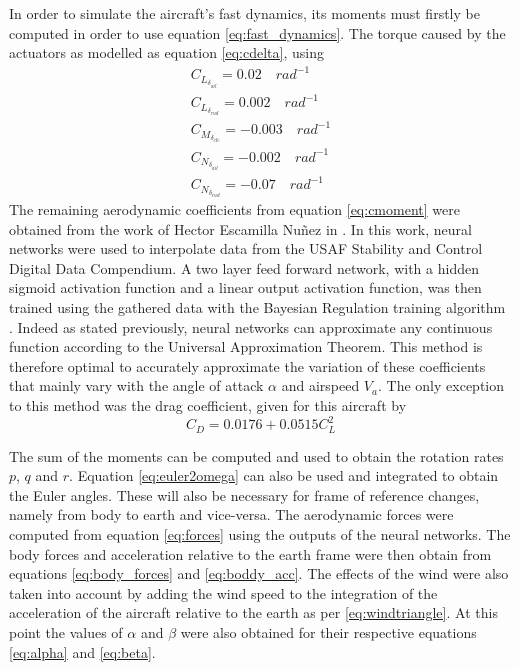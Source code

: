 In order to simulate the aircraft's fast dynamics, its moments must firstly be computed in order to use equation \ref{eq:fast_dynamics}. The torque caused by the actuators as modelled as equation \ref{eq:cdelta}, using
\begin{gather*}
C_{L_{\delta_{ail}}}=0.02 \quad rad^{-1}\\
C_{L_{\delta_{rud}}}=0.002 \quad rad^{-1}\\
C_{M_{\delta_{ele}}}=-0.003 \quad rad^{-1}\\
C_{N_{\delta_{ail}}}= -0.002 \quad rad^{-1}\\
C_{N_{\delta_{rud}}}= -0.07 \quad rad^{-1}
\end{gather*}
The remaining aerodynamic coefficients from equation \ref{eq:cmoment} were obtained from the work of Hector Escamilla Nuñez in \cite{hector}. In this work, neural networks were used to interpolate data from the USAF Stability and Control Digital Data Compendium. A two layer feed forward network, with a hidden sigmoid activation function and a linear output activation function, was then trained using the gathered data with the Bayesian Regulation training algorithm \cite{hector}. Indeed as stated previously, neural networks can approximate any continuous function according to the Universal Approximation Theorem. This method is therefore optimal to accurately approximate the variation of these coefficients that mainly vary with the angle of attack $\alpha$ and airspeed $V_a$. The only exception to this method was the drag coefficient, given for this aircraft by
\begin{equation}
C_D=0.0176+0.0515 C_L^2
\label{eq:cd_cl}
\end{equation}

The sum of the moments can be computed and used to obtain the rotation rates $p$, $q$ and $r$. Equation \ref{eq:euler2omega} can also be used and integrated to obtain the Euler angles. These will also be necessary for frame of reference changes, namely from body to earth and vice-versa. The aerodynamic forces were computed from equation \ref{eq:forces} using the outputs of the neural networks. The body forces and acceleration relative to the earth frame were then obtain from equations \ref{eq:body_forces} and \ref{eq:boddy_acc}. 
The effects of the wind were also taken into account by adding the wind speed to the integration of the acceleration of the aircraft relative to the earth as per \ref{eq:windtriangle}. At this point the values of $\alpha$ and $\beta$ were also obtained for their respective equations \ref{eq:alpha} and \ref{eq:beta}. 

